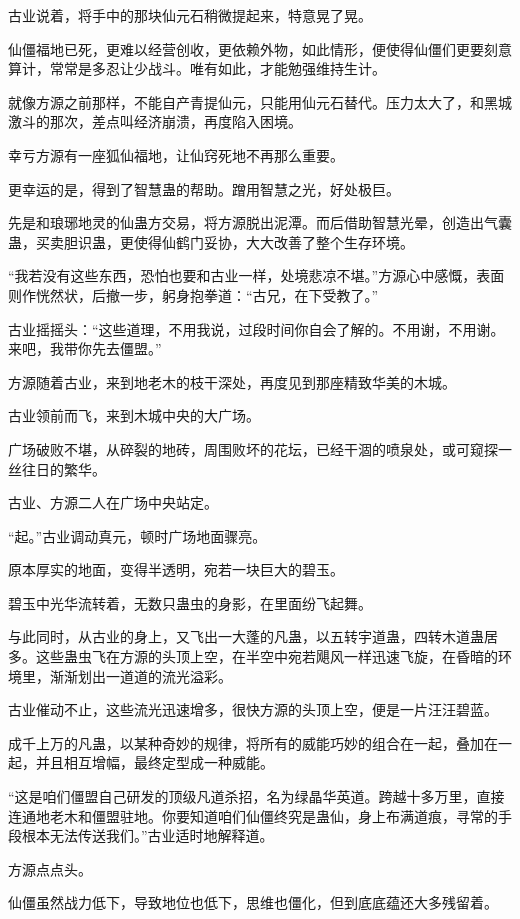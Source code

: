 \begin{this_body}
古业说着，将手中的那块仙元石稍微提起来，特意晃了晃。

仙僵福地已死，更难以经营创收，更依赖外物，如此情形，便使得仙僵们更要刻意算计，常常是多忍让少战斗。唯有如此，才能勉强维持生计。

就像方源之前那样，不能自产青提仙元，只能用仙元石替代。压力太大了，和黑城激斗的那次，差点叫经济崩溃，再度陷入困境。

幸亏方源有一座狐仙福地，让仙窍死地不再那么重要。

更幸运的是，得到了智慧蛊的帮助。蹭用智慧之光，好处极巨。

先是和琅琊地灵的仙蛊方交易，将方源脱出泥潭。而后借助智慧光晕，创造出气囊蛊，买卖胆识蛊，更使得仙鹤门妥协，大大改善了整个生存环境。

“我若没有这些东西，恐怕也要和古业一样，处境悲凉不堪。”方源心中感慨，表面则作恍然状，后撤一步，躬身抱拳道：“古兄，在下受教了。”

古业摇摇头：“这些道理，不用我说，过段时间你自会了解的。不用谢，不用谢。来吧，我带你先去僵盟。”

方源随着古业，来到地老木的枝干深处，再度见到那座精致华美的木城。

古业领前而飞，来到木城中央的大广场。

广场破败不堪，从碎裂的地砖，周围败坏的花坛，已经干涸的喷泉处，或可窥探一丝往日的繁华。

古业、方源二人在广场中央站定。

“起。”古业调动真元，顿时广场地面骤亮。

原本厚实的地面，变得半透明，宛若一块巨大的碧玉。

碧玉中光华流转着，无数只蛊虫的身影，在里面纷飞起舞。

与此同时，从古业的身上，又飞出一大蓬的凡蛊，以五转宇道蛊，四转木道蛊居多。这些蛊虫飞在方源的头顶上空，在半空中宛若飓风一样迅速飞旋，在昏暗的环境里，渐渐划出一道道的流光溢彩。

古业催动不止，这些流光迅速增多，很快方源的头顶上空，便是一片汪汪碧蓝。

成千上万的凡蛊，以某种奇妙的规律，将所有的威能巧妙的组合在一起，叠加在一起，并且相互增幅，最终定型成一种威能。

“这是咱们僵盟自己研发的顶级凡道杀招，名为绿晶华英道。跨越十多万里，直接连通地老木和僵盟驻地。你要知道咱们仙僵终究是蛊仙，身上布满道痕，寻常的手段根本无法传送我们。”古业适时地解释道。

方源点点头。

仙僵虽然战力低下，导致地位也低下，思维也僵化，但到底底蕴还大多残留着。


\end{this_body}
